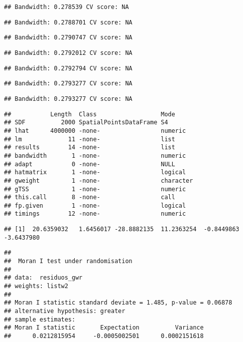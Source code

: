 \documentclass[
]{article}
\begin{document}
\begin{verbatim}
## Bandwidth: 0.278539 CV score: NA
\end{verbatim}

\begin{verbatim}
## Bandwidth: 0.2788701 CV score: NA
\end{verbatim}

\begin{verbatim}
## Bandwidth: 0.2790747 CV score: NA
\end{verbatim}

\begin{verbatim}
## Bandwidth: 0.2792012 CV score: NA
\end{verbatim}

\begin{verbatim}
## Bandwidth: 0.2792794 CV score: NA
\end{verbatim}

\begin{verbatim}
## Bandwidth: 0.2793277 CV score: NA
\end{verbatim}

\begin{verbatim}
## Bandwidth: 0.2793277 CV score: NA
\end{verbatim}

\begin{verbatim}
##           Length  Class                  Mode     
## SDF          2000 SpatialPointsDataFrame S4       
## lhat      4000000 -none-                 numeric  
## lm             11 -none-                 list     
## results        14 -none-                 list     
## bandwidth       1 -none-                 numeric  
## adapt           0 -none-                 NULL     
## hatmatrix       1 -none-                 logical  
## gweight         1 -none-                 character
## gTSS            1 -none-                 numeric  
## this.call       8 -none-                 call     
## fp.given        1 -none-                 logical  
## timings        12 -none-                 numeric
\end{verbatim}

\begin{verbatim}
## [1]  20.6359032   1.6456017 -28.8882135  11.2363254  -0.8449863  -3.6437980
\end{verbatim}

\begin{verbatim}
## 
##  Moran I test under randomisation
## 
## data:  residuos_gwr  
## weights: listw2    
## 
## Moran I statistic standard deviate = 1.485, p-value = 0.06878
## alternative hypothesis: greater
## sample estimates:
## Moran I statistic       Expectation          Variance 
##      0.0212815954     -0.0005002501      0.0002151618
\end{verbatim}
\end{document}
